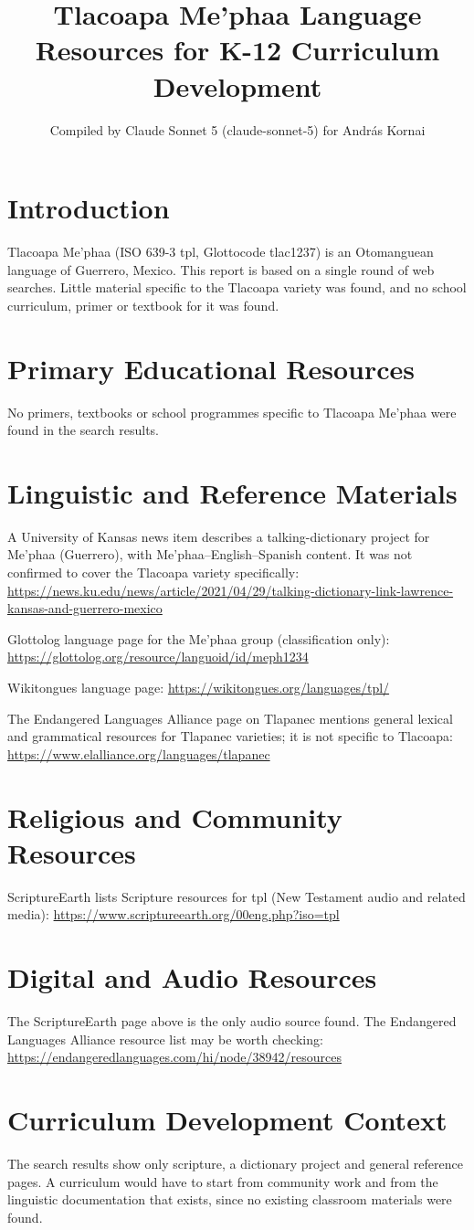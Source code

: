 \documentclass[12pt]{article}
\title{Tlacoapa Me'phaa Language Resources for K-12 Curriculum Development}
\author{Compiled by Claude Sonnet 5 (claude-sonnet-5) for Andr\'as Kornai}
\date{}
\begin{document}
\maketitle
\section{Introduction}
Tlacoapa Me'phaa (ISO 639-3 tpl, Glottocode tlac1237) is an Otomanguean language of Guerrero, Mexico. This report is based on a single round of web searches. Little material specific to the Tlacoapa variety was found, and no school curriculum, primer or textbook for it was found.
\section{Primary Educational Resources}
No primers, textbooks or school programmes specific to Tlacoapa Me'phaa were found in the search results.
\section{Linguistic and Reference Materials}
A University of Kansas news item describes a talking-dictionary project for Me'phaa (Guerrero), with Me'phaa--English--Spanish content. It was not confirmed to cover the Tlacoapa variety specifically: \url{https://news.ku.edu/news/article/2021/04/29/talking-dictionary-link-lawrence-kansas-and-guerrero-mexico}

Glottolog language page for the Me'phaa group (classification only): \url{https://glottolog.org/resource/languoid/id/meph1234}

Wikitongues language page: \url{https://wikitongues.org/languages/tpl/}

The Endangered Languages Alliance page on Tlapanec mentions general lexical and grammatical resources for Tlapanec varieties; it is not specific to Tlacoapa: \url{https://www.elalliance.org/languages/tlapanec}
\section{Religious and Community Resources}
ScriptureEarth lists Scripture resources for tpl (New Testament audio and related media): \url{https://www.scriptureearth.org/00eng.php?iso=tpl}
\section{Digital and Audio Resources}
The ScriptureEarth page above is the only audio source found. The Endangered Languages Alliance resource list may be worth checking: \url{https://endangeredlanguages.com/hi/node/38942/resources}
\section{Curriculum Development Context}
The search results show only scripture, a dictionary project and general reference pages. A curriculum would have to start from community work and from the linguistic documentation that exists, since no existing classroom materials were found.
\end{document}
